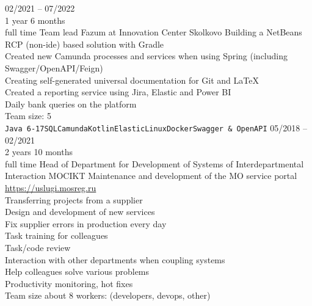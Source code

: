 

\begin{entrylist}
    \entry
    {02/2021 -- 07/2022\\\footnotesize{1 year 6 months\\full time}}
    {Team lead}
    {Fazum at Innovation Center Skolkovo}
    {
        Building a NetBeans RCP (non-ide) based solution with Gradle \\
    Created new Camunda processes and services when using Spring (including Swagger/OpenAPI/Feign) \\
    Creating self-generated universal documentation for Git and LaTeX \\
    Created a reporting service using Jira, Elastic and Power BI \\
    Daily bank queries on the platform \\
    Team size: 5 \\
    \texttt{Java 6-17}\slashsep\texttt{SQL}\slashsep\texttt{Camunda}\slashsep\texttt{Kotlin}\slashsep\texttt{Elastic}\slashsep\texttt{Linux}\slashsep\texttt{Docker}\slashsep\texttt{Swagger \& OpenAPI}
    }
    \entry
    {05/2018 -- 02/2021\\\footnotesize{2 years 10 months\\full time}}
    {Head of Department for Development of Systems of Interdepartmental Interaction}
    {MOCIKT}
    {
        Maintenance and development of the MO service portal \url{https://uslugi.mosreg.ru} \\
        Transferring projects from a supplier \\
        Design and development of new services \\
        Fix supplier errors in production every day \\
        Task training for colleagues \\
        Task/code review \\
        Interaction with other departments when coupling systems \\
        Help colleagues solve various problems \\
        Productivity monitoring, hot fixes \\
    Team size about 8 workers: (developers, devops, other) \\
}
\end{entrylist}
